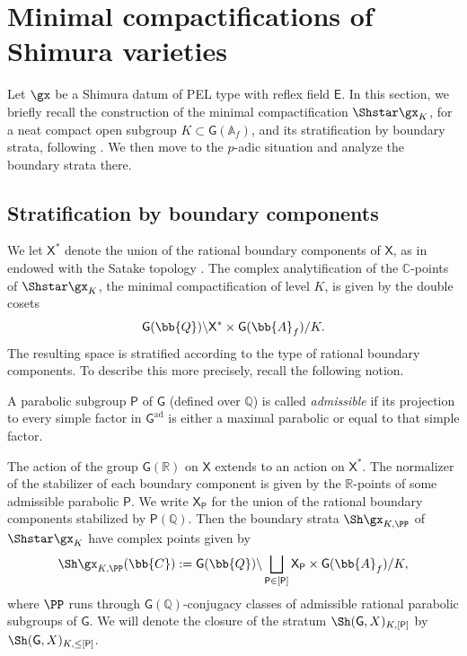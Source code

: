 \documentclass[letterpaper,11pt]{amsart}
\begin{document}
\section{Minimal compactifications of Shimura varieties}{\label{sec: stratifications}}

Let $\gx$ be a Shimura datum of PEL type with reflex field $\mathsf E$. In this section, we briefly recall the construction of the minimal compactification $\Shstar\gx_K$, for a neat compact open subgroup $K\subset\mathsf{G}(\mathbb{A}_f)$, and its stratification by boundary strata, following \cite{PinkHigherDirectImages}. We then move to the $p$-adic situation and analyze the boundary strata there. 

\subsection{Stratification by boundary components}\label{Subsub:StratificationShimura}
We let $\mathsf{X}^\ast$ denote the union of the rational boundary components of $\mathsf{X}$, as in \cite[Section~3.5]{PinkHigherDirectImages} endowed with the Satake topology \cite[Section~3.1]{PinkHigherDirectImages}. The complex analytification of the $\mathbb{C}$-points of $\Shstar\gx_{K}$, the minimal compactification of level $K$, is given by the double cosets 
\begin{equation}{\label{eqn: adelicquotientdefiningminimalcompactification}}
\mathsf{G}(\bb{Q}) \backslash \mathsf{X}^{*} \times \mathsf{G}(\bb{A}_{f})/K. 
\end{equation}
The resulting space is stratified according to the type of rational boundary components. To describe this more precisely, recall the following notion.
\begin{definition}{\label{defn: admissibleparabolic}}
    A parabolic subgroup $\mathsf{P}$ of $\mathsf{G}$ (defined over $\mathbb{Q}$) is called \emph{admissible} if its projection to every simple factor in $\mathsf{G}^\mathrm{ad}$ is either a maximal parabolic or equal to that simple factor.
\end{definition}

The action of the group $\mathsf{G}(\mathbb{R})$ on $\mathsf X$ extends to an action on $\mathsf X^\ast$. The normalizer of the stabilizer of each boundary component is given by the $\mathbb{R}$-points of some admissible parabolic $\mathsf{P}$. We write $\mathsf{X}_{\mathsf{P}}$ for the union of the rational boundary components stabilized by $\mathsf{P}(\mathbb{Q})$. Then the boundary strata $\Sh\gx_{K,\PP}$ of 
$\Shstar\gx_{K}$ have complex points given by 
\[\Sh\gx_{K,\PP}(\bb{C}) := \mathsf{G}(\bb{Q})\backslash \bigsqcup_{\mathsf{P}\in [\mathsf{P}]} \mathsf{X}_{\mathsf{P}} \times \mathsf{G}(\bb{A}_{f})/K, \]
where $\PP$ runs through $\mathsf{G}(\mathbb{Q})$-conjugacy classes of admissible rational parabolic subgroups of $\mathsf{G}$. We will denote the closure of the stratum $\Sh(\mathsf{G},X)_{K,[\mathsf{P}]}$ by $\Sh(\mathsf{G},X)_{K,\leq [\mathsf{P}]}$. 
\end{document}
